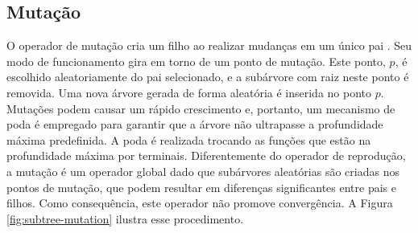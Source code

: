 \subsection{Mutação}
O operador de mutação cria um filho ao realizar mudanças em um único pai \cite{poli2008,banzhaf1998,koza1992}. Seu modo de funcionamento gira em torno de um ponto de mutação. Este ponto, $p$, é escolhido aleatoriamente do pai selecionado, e a subárvore com raiz neste ponto é removida. Uma nova árvore gerada de forma aleatória é inserida no ponto $p$. Mutações podem causar um rápido crescimento e, portanto, um mecanismo de poda é empregado para garantir que a árvore não ultrapasse a profundidade máxima predefinida. A poda é realizada trocando as funções que estão na profundidade máxima por terminais. Diferentemente do operador de reprodução, a mutação é um operador global dado que subárvores aleatórias são criadas nos pontos de mutação, que podem resultar em diferenças significantes entre pais e filhos. Como consequência, este operador não promove convergência. A Figura \ref{fig:subtree-mutation} ilustra esse procedimento.

